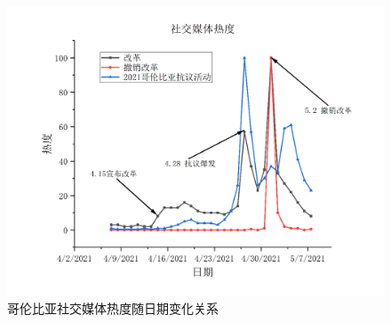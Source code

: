 \documentclass{phyasgn}\usepackage{nag}
\begin{document}
\begin{figure}[!h]
                    	\centering
                    	\includegraphics[width=.9\linewidth]{pic/8.png}
                    	\caption{哥伦比亚社交媒体热度随日期变化关系}
                    	\label{fig:8}
                    	\end{figure}
\end{document}
